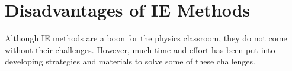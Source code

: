 %
%
%
%
%
%
%
\section{Disadvantages of IE Methods}

Although IE methods are a boon for the physics classroom, they do not come without their challenges. However, much time and effort has been put into developing strategies and materials to solve some of these challenges.

%
%
%
